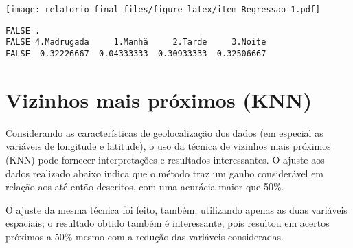 \documentclass[
  12pt,
  portuguese,
]{report}
\begin{document}
\texttt{[image: relatorio\_final\_files/figure-latex/item Regressao-1.pdf]}

\begin{verbatim}
FALSE .
FALSE 4.Madrugada     1.Manhã     2.Tarde     3.Noite 
FALSE  0.32226667  0.04333333  0.30933333  0.32506667
\end{verbatim}

\hypertarget{vizinhos-mais-pruxf3ximos-knn}{%
\section{Vizinhos mais próximos (KNN)}\label{vizinhos-mais-pruxf3ximos-knn}}

Considerando as características de geolocalização dos dados (em especial as variáveis de longitude e latitude), o uso da técnica de vizinhos mais próximos (KNN) pode fornecer interpretações e resultados interessantes. O ajuste aos dados realizado abaixo indica que o método traz um ganho considerável em relação aos até então descritos, com uma acurácia maior que 50\%.

O ajuste da mesma técnica foi feito, também, utilizando apenas as duas variáveis espaciais; o resultado obtido também é interessante, pois resultou em acertos próximos a 50\% mesmo com a redução das variáveis consideradas.
\end{document}
